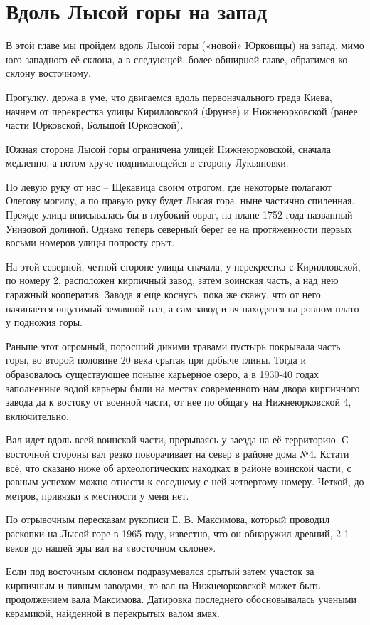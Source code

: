 \chapter{Вдоль Лысой горы на запад}

В этой главе мы пройдем вдоль Лысой горы («новой» Юрковицы) на запад, мимо юго-западного её склона, а в следующей, более обширной главе, обратимся ко склону восточному.

Прогулку, держа в уме, что двигаемся вдоль первоначального града Киева, начнем от перекрестка улицы Кирилловской (Фрунзе) и Нижнеюрковской (ранее части Юрковской, Большой Юрковской).

Южная сторона Лысой горы ограничена улицей Нижнеюрковской, сначала медленно, а потом круче поднимающейся в сторону Лукьяновки.

По левую руку от нас – Щекавица своим отрогом, где некоторые полагают Олегову могилу, а по правую руку будет Лысая гора, ныне частично спиленная. Прежде улица вписывалась бы в глубокий овраг, на плане 1752 года названный Унизовой долиной. Однако теперь северный берег ее на протяженности первых восьми номеров улицы попросту срыт.

На этой северной, четной стороне улицы сначала, у перекрестка с Кирилловской, по номеру 2, расположен кирпичный завод, затем  воинская часть, а над нею гаражный кооператив. Завода я еще коснусь, пока же скажу, что от него начинается ощутимый земляной вал, а сам завод и вч находятся на ровном плато у подножия горы.

Раньше этот огромный, поросший дикими травами пустырь покрывала часть горы, во второй половине 20 века срытая при добыче глины. Тогда и образовалось существующее поныне карьерное озеро, а в 1930-40 годах заполненные водой карьеры были на местах современного нам двора кирпичного завода да к востоку от военной части, от нее по общагу на Нижнеюрковской 4, включительно.

Вал идет вдоль всей воинской части, прерываясь у заезда на её территорию. С восточной стороны вал резко поворачивает на север в районе дома №4. Кстати всё, что сказано ниже об археологических находках в районе воинской части, с равным успехом можно отнести к соседнему с ней четвертому номеру. Четкой, до метров, привязки к местности у меня нет.

По отрывочным пересказам рукописи Е. В. Максимова, который проводил раскопки на Лысой горе в 1965 году, известно, что он обнаружил древний, 2-1 веков до нашей эры вал на «восточном склоне». 

Если под восточным склоном подразумевался срытый затем участок за кирпичным и пивным заводами, то вал на Нижнеюрковской может быть продолжением вала Максимова. Датировка последнего обосновывалась учеными керамикой, найденной в перекрытых валом ямах.

